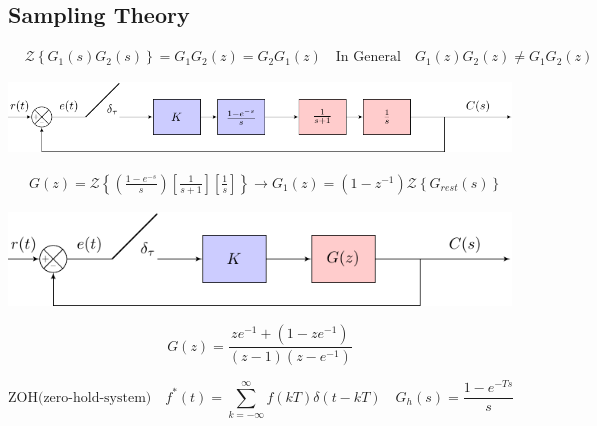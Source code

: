\begin{multicols}{2}
\subsection{Sampling Theory}
\vspace*{-0.25cm}
\begin{align*}
& \mathcal{Z} \left\{G_1(s)G_2(s)\right\}=G_1G_2(z)= G_2G_1(z) \quad \text{In General} \quad G_1(z)G_2(z) \neq G_1G_2(z)
\end{align*}
\vspace*{-0.175cm}
\begin{minipage}[t]{1\linewidth}
\includegraphics[width=1\linewidth]{samplerTesting-cropped.pdf}
\end{minipage}
\begin{align*}
& G(z) = \mathcal{Z} \left\{\left(\frac{1-e^{-s}}{s}\right) \left[ \frac{1}{s+1}\right] \left[\frac{1}{s}\right] \right\} \rightarrow G_1(z) = (1-z^{-1})\mathcal{Z} \left\{ G_{rest}(s) \right\}
\end{align*}
\begin{minipage}[h]{0.65\linewidth}
\includegraphics[width=1.05\linewidth]{sampleEND-cropped.pdf}%
\end{minipage}
\begin{minipage}[h]{0.35\linewidth}
\[
G(z) = \frac{ze^{-1}+(1-ze^{-1})}{(z-1)(z-e^{-1})} 
\]
\end{minipage}
$$ \text{ZOH(zero-hold-system)} \quad 
f^\ast(t) = \sum_{k=-\infty}^\infty f(kT)\delta(t-kT)  \quad 
G_{h}(s)= \frac{1-e^{-Ts}}{s}
$$

\end{multicols}
